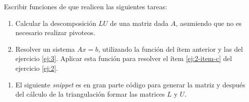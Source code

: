 \begin{enunciado}{\ejercicio}
  Escribir funciones de \python que realicen las siguientes tareas:
  \begin{enumerate}[label=(\alph*)]
    \item Calcular la descomposición $LU$ de una matriz dada $A$, asumiendo que no es
          necesario realizar pivoteos.

    \item Resolver un sistema $Ax = b$, utilizando la función del ítem anterior y las
          del ejercicio \ref{ej:3}. Aplicar esta función para resolver el ítem \ref{ej:2-item-c} del
          ejercicio \ref{ej:2}.
  \end{enumerate}
\end{enunciado}

\begin{enumerate}[label=(\alph*)]
  \item El siguiente \textit{snippet} es en gran parte código para generar
        la matriz y después del cálculo de la triangulación formar las
        matrices $L$ y $U$.

        \copyPaste
\end{enumerate}

